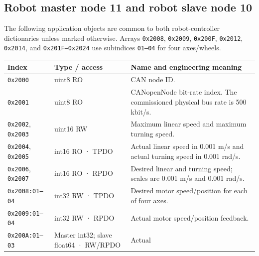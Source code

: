 \documentclass[
  10pt,
  letterpaper,
  openany]{report}
\newcounter{none} %
\begin{document}
\subsection{Robot master node 11 and robot slave node
10}\label{robot-master-node-11-and-robot-slave-node-10}

The following application objects are common to both robot-controller
dictionaries unless marked otherwise. Arrays \texttt{0x2008},
\texttt{0x2009}, \texttt{0x200F}, \texttt{0x2012}, \texttt{0x2014}, and
\texttt{0x201F–0x2024} use subindices \texttt{01–04} for four
axes/wheels.

{\def\LTcaptype{none} %
\begin{longtable}[]{@{}
  >{\raggedright\arraybackslash}p{}
  >{\raggedright\arraybackslash}p{}
  >{\raggedright\arraybackslash}p{}@{}}
\toprule\noalign{}
\begin{minipage}[b]{\linewidth}\raggedright
Index
\end{minipage} & \begin{minipage}[b]{\linewidth}\raggedright
Type / access
\end{minipage} & \begin{minipage}[b]{\linewidth}\raggedright
Name and engineering meaning
\end{minipage} \\
\midrule\noalign{}
\endhead
\bottomrule\noalign{}
\endlastfoot
\texttt{0x2000} & uint8 RO & CAN node ID. \\
\texttt{0x2001} & uint8 RO & CANopenNode bit-rate index. The
commissioned physical bus rate is 500 kbit/s. \\
\texttt{0x2002}, \texttt{0x2003} & uint16 RW & Maximum linear speed and
maximum turning speed. \\
\texttt{0x2004}, \texttt{0x2005} & int16 RO · TPDO & Actual linear speed
in 0.001 m/s and actual turning speed in 0.001 rad/s. \\
\texttt{0x2006}, \texttt{0x2007} & int16 RO · RPDO & Desired linear and
turning speed; scales are 0.001 m/s and 0.001 rad/s. \\
\texttt{0x2008:01–04} & int32 RW · TPDO & Desired motor speed/position
for each of four axes. \\
\texttt{0x2009:01–04} & int32 RW · RPDO & Actual motor speed/position
feedback. \\
\texttt{0x200A:01–03} & Master int32; slave float64 · RW/RPDO & Actual

\end{longtable}}
\end{document}
